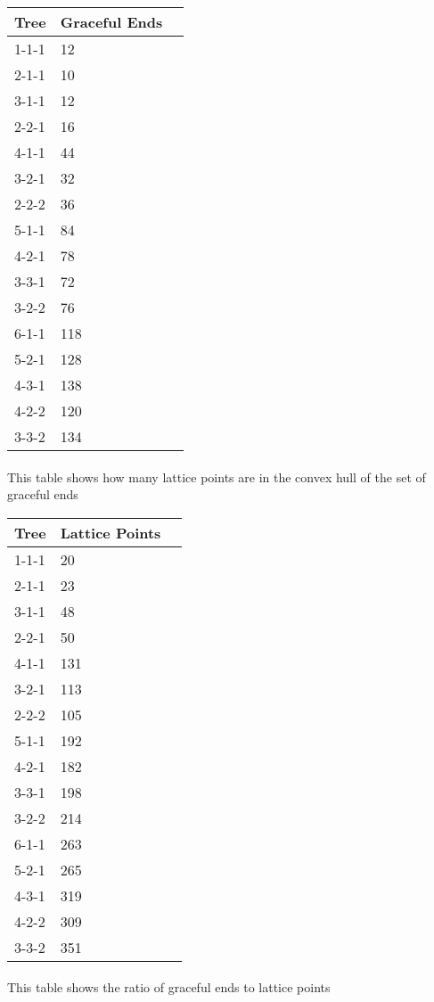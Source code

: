 \documentclass{article}
\begin{document}
\begin{center}
              \begin{tabular}{| l | l | l |}
              \hline
              Tree & Graceful Ends \\ 
              \hline
1-1-1 & 12\\
\hline
2-1-1 & 10\\
\hline
3-1-1 & 12\\
\hline
2-2-1 & 16\\
\hline
4-1-1 & 44\\
\hline
3-2-1 & 32\\
\hline
2-2-2 & 36\\
\hline
5-1-1 & 84\\
\hline
4-2-1 & 78\\
\hline
3-3-1 & 72\\
\hline
3-2-2 & 76\\
\hline
6-1-1 & 118\\
\hline
5-2-1 & 128\\
\hline
4-3-1 & 138\\
\hline
4-2-2 & 120\\
\hline
3-3-2 & 134\\
\hline
\hline
              \end{tabular}
              \end{center}\paragraph{} This table shows how many lattice points are in             the convex hull of the set of graceful ends
\begin{center}
              \begin{tabular}{| l | l | l |}
              \hline
              Tree & Lattice Points \\ 
              \hline
1-1-1 & 20\\
\hline
2-1-1 & 23\\
\hline
3-1-1 & 48\\
\hline
2-2-1 & 50\\
\hline
4-1-1 & 131\\
\hline
3-2-1 & 113\\
\hline
2-2-2 & 105\\
\hline
5-1-1 & 192\\
\hline
4-2-1 & 182\\
\hline
3-3-1 & 198\\
\hline
3-2-2 & 214\\
\hline
6-1-1 & 263\\
\hline
5-2-1 & 265\\
\hline
4-3-1 & 319\\
\hline
4-2-2 & 309\\
\hline
3-3-2 & 351\\
\hline
\hline
              \end{tabular}
              \end{center}\paragraph{} This table shows the ratio of graceful ends to             lattice points
\end{document}
